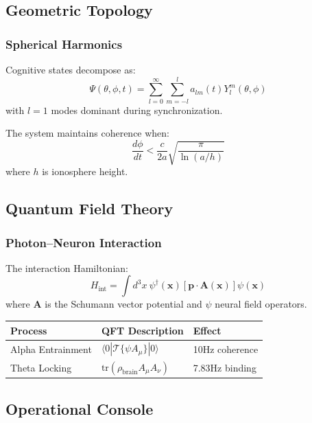 \documentclass[12pt]{article}
\begin{document}
\subsection{Geometric Topology}

\subsubsection{Spherical Harmonics}
Cognitive states decompose as:
\[
\Psi(\theta,\phi,t) = \sum_{l=0}^\infty \sum_{m=-l}^l a_{lm}(t) Y_l^m(\theta,\phi)
\]
with $l=1$ modes dominant during synchronization.

\begin{lemma}
The system maintains coherence when:
\[
\frac{d\phi}{dt} < \frac{c}{2a}\sqrt{\frac{\pi}{\ln(a/h)}}
\]
where $h$ is ionosphere height.
\end{lemma}

\subsection{Quantum Field Theory}

\subsubsection{Photon–Neuron Interaction}
The interaction Hamiltonian:
\[
H_{\text{int}} = \int d^3x \ \psi^\dagger(\mathbf{x})\left[\mathbf{p} \cdot \mathbf{A}(\mathbf{x})\right]\psi(\mathbf{x})
\]
where $\mathbf{A}$ is the Schumann vector potential and $\psi$ neural field operators.

\begin{table}[h]
\centering
\begin{tabular}{|l|l|l|}
\hline
\textbf{Process} & \textbf{QFT Description} & \textbf{Effect} \\ \hline
Alpha Entrainment & $\langle 0| \mathcal{T}\{\psi A_\mu \}|0 \rangle$ & 10Hz coherence \\ \hline
Theta Locking & $\text{tr}(\rho_{\text{brain}} A_\mu A_\nu)$ & 7.83Hz binding \\ \hline
\end{tabular}
\end{table}

\subsection{Operational Console}
\end{document}
